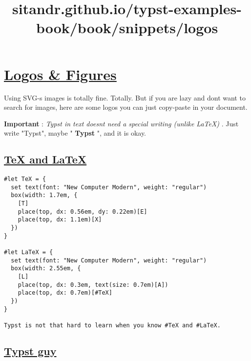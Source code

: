 \title{sitandr.github.io/typst-examples-book/book/snippets/logos}

\section{\texorpdfstring{\hyperref[logos--figures]{Logos \&
Figures}}{Logos \& Figures}}\label{logos--figures}

Using SVG-s images is totally fine. Totally. But if you are lazy and
don\textquotesingle t want to search for images, here are some logos you
can just copy-paste in your document.

\textbf{Important} : \emph{Typst in text doesn\textquotesingle t need a
special writing (unlike LaTeX)} . Just write "Typst", maybe "
\textbf{Typst} ", and it is okay.

\subsection{\texorpdfstring{\hyperref[tex-and-latex]{TeX and
LaTeX}}{TeX and LaTeX}}\label{tex-and-latex}

\begin{verbatim}
#let TeX = {
  set text(font: "New Computer Modern", weight: "regular")
  box(width: 1.7em, {
    [T]
    place(top, dx: 0.56em, dy: 0.22em)[E]
    place(top, dx: 1.1em)[X]
  })
}

#let LaTeX = {
  set text(font: "New Computer Modern", weight: "regular")
  box(width: 2.55em, {
    [L]
    place(top, dx: 0.3em, text(size: 0.7em)[A])
    place(top, dx: 0.7em)[#TeX]
  })
}

Typst is not that hard to learn when you know #TeX and #LaTeX.
\end{verbatim}

\pandocbounded{}

\subsection{\texorpdfstring{\hyperref[typst-guy]{Typst
guy}}{Typst guy}}\label{typst-guy}

